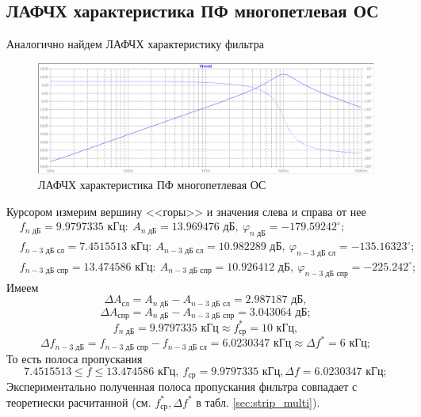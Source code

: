\documentclass[a4paper, 12pt]{article}
\begin{document}
    \subsection{ЛАФЧХ характеристика ПФ многопетлевая ОС}
    Аналогично найдем ЛАФЧХ характеристику фильтра
    \begin{figure}[H]
        \centering
        \includegraphics[scale=0.46]{4task_lapfr.png}
        \captionsetup{skip=0pt}
        \caption{ЛАФЧХ характеристика ПФ многопетлевая ОС}
        \label{fig:4task_lapfr}
    \end{figure}
    \noindent Курсором измерим вершину <<горы>> и значения слева и справа от нее
    \begin{align*}
    &f_{n\text{ дБ}}=9.9797335\text{ кГц}:\ A_{n\text{ дБ}}=13.969476\text{ дБ},\ \varphi_{n\text{ дБ}}=-179.59242^{\circ};\\
    &f_{n-3\text{ дБ сл}}=7.4515513 \text{ кГц}:\ A_{n-3\text{ дБ сл}}=10.982289\text{ дБ},\ \varphi_{n-3\text{ дБ сл}}=-135.16323^{\circ};\\
    &f_{n-3\text{ дБ спр}}=13.474586 \text{ кГц}:\ A_{n-3\text{ дБ спр}}=10.926412\text{ дБ},\ \varphi_{n-3\text{ дБ спр}}=-225.242^{\circ};
    \end{align*}
    Имеем
    $$
    \Delta A_\text{сл}=A_{n\text{ дБ}}-A_{n-3\text{ дБ сл}}=2.987187\text{ дБ},
    $$
    $$
    \Delta A_\text{спр}=A_{n\text{ дБ}}-A_{n-3\text{ дБ спр}}=3.043064\text{ дБ};
    $$
    $$
    f_{n\text{ дБ}}=9.9797335\text{ кГц}\approx f_\text{ср}^*=10\text{ кГц},
    $$
    $$
    \Delta f_{n-3\text{ дБ}}=f_{n-3\text{ дБ спр}}-f_{n-3\text{ дБ сл}}=6.0230347\text{ кГц}\approx \Delta f^*=6\text{ кГц};
    $$
    То есть полоса пропускания
    $$
    7.4515513\leq f\leq13.474586\text{ кГц},\ f_\text{ср}=9.9797335\text{ кГц}, \Delta f=6.0230347\text{ кГц};
    $$
    Экспериментально полученная полоса пропускания фильтра совпадает с теоретиески расчитанной (см. $f_\text{ср}^*,\Delta f^*$ в табл. \ref{sec:strip_multi}).
\end{document}
